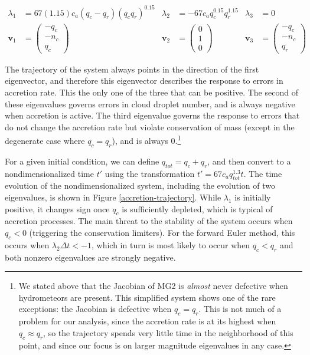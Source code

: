 \documentclass [11pt, proquest] {uwthesis}[2020/02/24]
\begin{document}
\begin{align}
  \lambda_1 &= 67 (1.15) c_a (q_c - q_r) (q_c q_r)^{0.15} & \lambda_2 &= -67 c_a q_c^{0.15} q_r^{1.15} & \lambda_3 &= 0 \\
  \mathbf{v}_1 &= 
  \begin{pmatrix}
    -q_c \\ -n_c \\ q_c
  \end{pmatrix} & \mathbf{v}_2 &= 
  \begin{pmatrix}
    0 \\ 1 \\ 0
  \end{pmatrix} & \mathbf{v}_3 &= 
  \begin{pmatrix}
    -q_c \\ -n_c \\ q_r
  \end{pmatrix}
\end{align}

The trajectory of the system always points in the direction of the first eigenvector, and therefore this eigenvector describes the response to errors in accretion rate. This the only one of the three that can be positive. The second of these eigenvalues governs errors in cloud droplet number, and is always negative when accretion is active. The third eigenvalue governs the response to errors that do not change the accretion rate but violate conservation of mass (except in the degenerate case where $q_c = q_r$), and is always \num{0}.\footnote{We stated above that the Jacobian of MG2 is \emph{almost} never defective when hydrometeors are present. This simplified system shows one of the rare exceptions: the Jacobian is defective when $q_c = q_r$. This is not much of a problem for our analysis, since the accretion rate is at its highest when $q_c \approx q_r$, so the trajectory spends very little time in the neighborhood of this point, and since our focus is on larger magnitude eigenvalues in any case.}

For a given initial condition, we can define $q_{tot} = q_c + q_r$, and then convert to a nondimensionalized time $t'$ using the transformation $t' = 67 c_a q_{tot}^{1.3} t$. The time evolution of the nondimensionalized system, including the evolution of two eigenvalues, is shown in Figure \ref{accretion-trajectory}. While $\lambda_1$ is initially positive, it changes sign once $q_c$ is sufficiently depleted, which is typical of accretion processes. The main threat to the stability of the system occurs when $q_c < 0$ (triggering the conservation limiters). For the forward Euler method, this occurs when $\lambda_2 \Delta t < -1$, which in turn is most likely to occur when $q_c < q_r$ and both nonzero eigenvalues are strongly negative.
\end{document}
